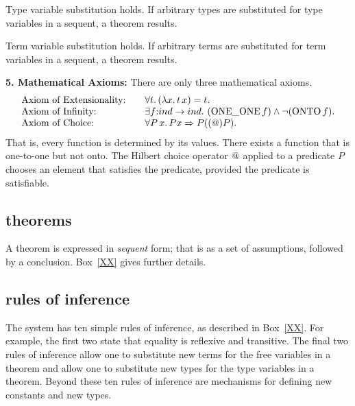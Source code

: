 \documentclass{llncs}
\def\op#1{{\hbox{#1}}} %
\def\tc{\hbox{:}}
\begin{document}
{{Type variable substitution holds.  If arbitrary types are substituted for type variables in a sequent, a theorem results.

Term variable substitution holds.  If arbitrary terms are substituted for term variables in a sequent, a theorem results.



\bigskip
{\bf 5. Mathematical Axioms:} There are only three mathematical axioms.
$$\begin{array}{lll}
\hbox{Axiom of Extensionality:} &\quad\forall t.\, (\lambda x.\, t\, x) = t.\\
\hbox{Axiom of Infinity:} &\quad\exists f\tc ind\to ind.\ (\op{ONE\_ONE}\,f) \land \neg(\op{ONTO}\, f).\\
\hbox{Axiom of Choice:}&\quad  \forall P\,x.\, P x \Rightarrow  P((\hbox{@}) P).\\
\end{array}
$$
That is, every function is determined by its values. There exists a function that is one-to-one but not onto.  The Hilbert choice operator $\hbox{@}$ applied to a predicate $P$ chooses an element that satisfies the predicate, provided the
predicate is satisfiable.


}} %
\bigskip



\subsection{theorems}

A theorem is expressed in {\it sequent} form; that is as a set 
of assumptions, followed by a conclusion.  Box~\ref{XX} gives further details.

\subsection{rules of inference}

The system has ten simple rules of inference, as described in Box~\ref{XX}.
For example, the first two state that equality is reflexive and transitive.
The final two rules
of inference allow one to substitute new terms for the free
variables in a theorem and  allow one to substitute new types for the
type variables in a theorem.  Beyond these ten rules of inference are mechanisms for
defining new constants and  new types.
\end{document}

